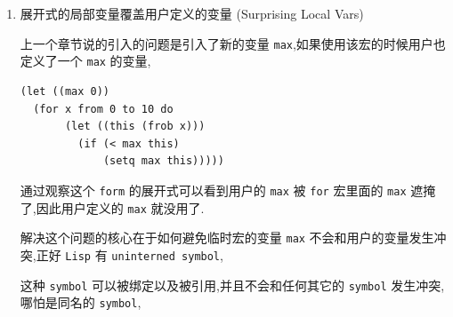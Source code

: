\documentclass[11pt]{article}
\begin{document}
\begin{enumerate}
下面是它的一个调用的展开式,

\begin{verbatim}
(for i from 1 to 3 do
     (setq square (* i i))
     (princ (format "\n%d %d" i square)))
↦
(let ((i 1))
  (while (<= i 3)
    (setq square (* i i))
    (princ (format "\n%d %d" i square))
    (setq var (1+ var))))

⊣1       1
⊣2       4
⊣3       9
⇒ nil
\end{verbatim}

\texttt{from}, \texttt{to} 以及 \texttt{do} 就是语法糖(\texttt{syntactic sugar}),可以无视它们.

这里有一个问题,在每一轮迭代中,参数 \texttt{final} 都会进行运算,

如果 \texttt{final} 是常量的话没有问题;

如果是一个复杂的 \texttt{form}, 比如一个耗时的函数调用,那么这会造成严重的性能问题,

并且如果 \texttt{final} 存在副作用,多次执行可能照成一些意想不到的结果.

正确的做法应该是把 \texttt{final} 的计算放到循环之外,

\begin{verbatim}
(defmacro for (var from init to final do &rest body)
  `(let ((,var ,init)
         (max ,final))
     (while (<= ,var max)
       ,@body
       (setq ,var (1+ ,var)))))
\end{verbatim}

不过这样会引入另外一个问题,下个小节接着讨论它.


\item 展开式的局部变量覆盖用户定义的变量 (Surprising Local Vars)
\label{sec:org82c5802}

上一个章节说的引入的问题是引入了新的变量 \texttt{max},如果使用该宏的时候用户也定义了一个 \texttt{max} 的变量,

\begin{verbatim}
(let ((max 0))
  (for x from 0 to 10 do
       (let ((this (frob x)))
         (if (< max this)
             (setq max this)))))
\end{verbatim}

通过观察这个 \texttt{form} 的展开式可以看到用户的 \texttt{max} 被 \texttt{for} 宏里面的 \texttt{max} 遮掩了,因此用户定义的 \texttt{max} 就没用了.

解决这个问题的核心在于如何避免临时宏的变量 \texttt{max} 不会和用户的变量发生冲突,正好 \texttt{Lisp} 有 \texttt{uninterned symbol},

这种 \texttt{symbol} 可以被绑定以及被引用,并且不会和任何其它的 \texttt{symbol} 发生冲突,哪怕是同名的 \texttt{symbol},


\end{enumerate}
\end{document}
